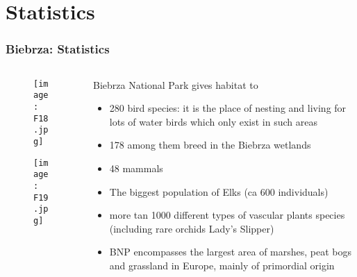 \documentclass[pdflatex,compress,8pt,
	xcolor={dvipsnames,dvipsnames,svgnames,x11names,table},
	hyperref={colorlinks = true,
	breaklinks = true, urlcolor = NavyBlue, breaklinks = true}]{beamer}
\begin{document}
\section{Statistics}
\begin{frame}\frametitle{Biebrza: Statistics}
\begin{minipage}[0.4\textheight]{\textwidth}
\begin{columns}[T]
\begin{column}{0.4\textwidth}
\vspace{2em}
\begin{figure}[H]
	\centering
		\texttt{[image: F18.jpg]}
\end{figure}
\begin{figure}[H]
	\centering
		\texttt{[image: F19.jpg]}
\end{figure}
\end{column}
\begin{column}{0.6\textwidth}
\vspace{2em} 
Biebrza National Park gives habitat to
\begin{itemize}
	\item 280 bird species: it is the place of nesting and living for lots of water birds which only exist in such areas
	\item 178 among them breed in the Biebrza wetlands
	\item 48 mammals
	\item The biggest population of Elks (ca 600 individuals)
	\item more tan 1000 different types of vascular plants species (including rare orchids Lady’s Slipper)
	\item BNP encompasses the largest area of marshes, peat bogs and grassland in Europe, mainly of primordial origin
\end{itemize}
\end{column}
\end{columns}
\end{minipage}
\end{frame}
\end{document}

